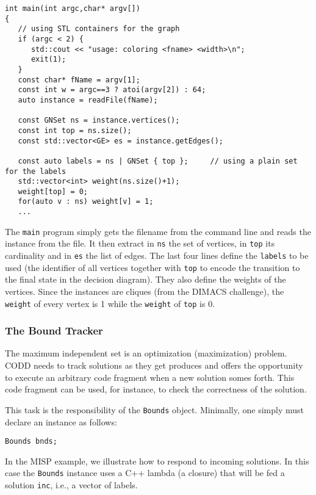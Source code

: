 \documentclass[11pt]{article}
\begin{document}
\begin{verbatim}
int main(int argc,char* argv[])
{
   // using STL containers for the graph
   if (argc < 2) {
      std::cout << "usage: coloring <fname> <width>\n";
      exit(1);
   }
   const char* fName = argv[1];
   const int w = argc==3 ? atoi(argv[2]) : 64;
   auto instance = readFile(fName);

   const GNSet ns = instance.vertices();
   const int top = ns.size();
   const std::vector<GE> es = instance.getEdges();

   const auto labels = ns | GNSet { top };     // using a plain set for the labels
   std::vector<int> weight(ns.size()+1);
   weight[top] = 0;
   for(auto v : ns) weight[v] = 1;
   ...
\end{verbatim}

The \texttt{main} program simply gets the filename from the command line and reads the
instance from the file. It then extract in \texttt{ns} the set of vertices, in \texttt{top} its cardinality and in \texttt{es} the list of edges. The last four lines define the \texttt{labels} to be used (the identifier of all vertices together with \texttt{top} to encode the transition to the final state in  the decision diagram). They also define the weights of the
vertices. Since the instances are cliques (from the DIMACS challenge), the \texttt{weight} of every vertex is 1 while the \texttt{weight} of \texttt{top} is 0.

\subsubsection{The Bound Tracker}
\label{sec:org338ae87}
The maximum independent set is an optimization (maximization) problem. CODD needs to track solutions as they get produces and offers the opportunity to execute an arbitrary code fragment when a new solution somes forth. This code fragment can be used, for instance, to check the correctness of the solution. 

This task is the responsibility of the \texttt{Bounds} object. Minimally, one simply must declare an instance as follows:
\begin{verbatim}
Bounds bnds;
\end{verbatim}

\begin{attention}
In the MISP example, we illustrate how to respond to incoming solutions. In this case the \texttt{Bounds} instance uses a C++ lambda (a closure) that will be fed a solution \texttt{inc}, i.e., a vector of labels.
\end{attention}
\end{document}
